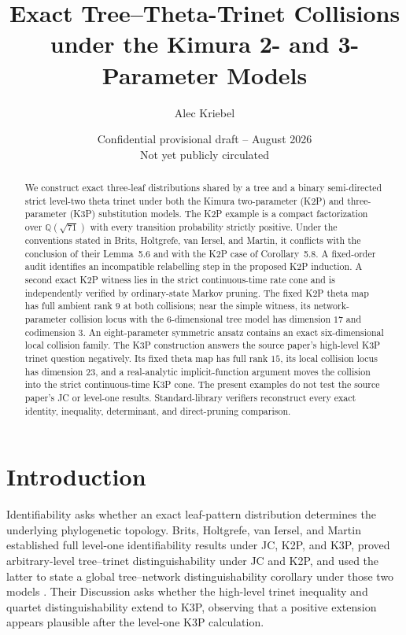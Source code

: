 \documentclass[11pt]{article}
\title{Exact Tree--Theta-Trinet Collisions\\under the Kimura 2- and 3-Parameter Models}
\author{Alec Kriebel}
\date{Confidential provisional draft -- August 2026\\Not yet publicly circulated}
\theoremstyle{remark}\newtheorem{remark}[theorem]{Remark}
\begin{document}
\maketitle
\begin{abstract}
We construct exact three-leaf distributions shared by a tree and a binary semi-directed strict level-two theta trinet under both the Kimura two-parameter (K2P) and three-parameter (K3P) substitution models. The K2P example is a compact factorization over $\mathbb Q(\sqrt{71})$ with every transition probability strictly positive. Under the conventions stated in Brits, Holtgrefe, van Iersel, and Martin, it conflicts with the conclusion of their Lemma~5.6 and with the K2P case of Corollary~5.8. A fixed-order audit identifies an incompatible relabelling step in the proposed K2P induction. A second exact K2P witness lies in the strict continuous-time rate cone and is independently verified by ordinary-state Markov pruning. The fixed K2P theta map has full ambient rank $9$ at both collisions; near the simple witness, its network-parameter collision locus with the $6$-dimensional tree model has dimension $17$ and codimension $3$. An eight-parameter symmetric ansatz contains an exact six-dimensional local collision family. The K3P construction answers the source paper's high-level K3P trinet question negatively. Its fixed theta map has full rank $15$, its local collision locus has dimension $23$, and a real-analytic implicit-function argument moves the collision into the strict continuous-time K3P cone. The present examples do not test the source paper's JC or level-one results. Standard-library verifiers reconstruct every exact identity, inequality, determinant, and direct-pruning comparison.
\end{abstract}

\section{Introduction}
Identifiability asks whether an exact leaf-pattern distribution determines the underlying phylogenetic topology. Brits, Holtgrefe, van Iersel, and Martin established full level-one identifiability results under JC, K2P, and K3P, proved arbitrary-level tree--trinet distinguishability under JC and K2P, and used the latter to state a global tree--network distinguishability corollary under those two models \cite{BritsHoltgrefeVanIerselMartin2026}. Their Discussion asks whether the high-level trinet inequality and quartet distinguishability extend to K3P, observing that a positive extension appears plausible after the level-one K3P calculation.
\end{document}
